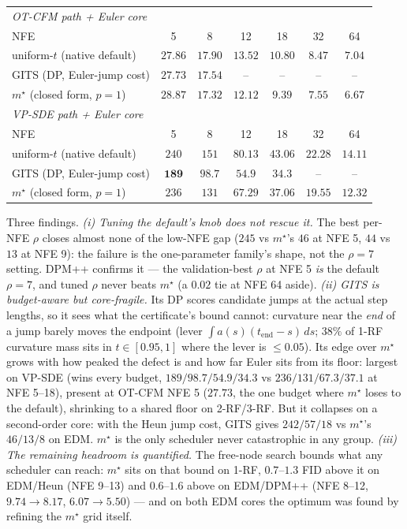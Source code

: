 \documentclass[11pt]{article}
\begin{document}
\begin{table}[p]
\begin{tabular}{lcccccc}
\midrule
\multicolumn{7}{l}{\emph{OT-CFM path + Euler core}}\\[1pt]
\quad NFE & 5 & 8 & 12 & 18 & 32 & 64\\
\quad uniform-$t$ (native default) & $\mathbf{27.86}$ & $17.90$ & $13.52$ & $10.80$ & $8.47$ & $7.04$\\
\quad GITS (DP, Euler-jump cost) & $\mathbf{27.73}$ & $\mathbf{17.54}$ & -- & -- & -- & --\\
\quad $m^\star$ (closed form, $p\!=\!1$) & $28.87$ & $\mathbf{17.32}$ & $\mathbf{12.12}$ & $\mathbf{9.39}$ & $\mathbf{7.55}$ & $\mathbf{6.67}$\\
\midrule
\multicolumn{7}{l}{\emph{VP-SDE path + Euler core}}\\[1pt]
\quad NFE & 5 & 8 & 12 & 18 & 32 & 64\\
\quad uniform-$t$ (native default) & $240$ & $151$ & $80.13$ & $43.06$ & $22.28$ & $14.11$\\
\quad GITS (DP, Euler-jump cost) & $\mathbf{189}$ & $\mathbf{98.7}$ & $\mathbf{54.9}$ & $\mathbf{34.3}$ & -- & --\\
\quad $m^\star$ (closed form, $p\!=\!1$) & $236$ & $131$ & $67.29$ & $37.06$ & $\mathbf{19.55}$ & $\mathbf{12.32}$\\
\bottomrule
\end{tabular}
\end{table}

\noindent Three findings. \emph{(i) Tuning the default's knob does not rescue
it.} The best per-NFE $\rho$ closes almost none of the low-NFE gap ($245$ vs
$m^\star$'s $46$ at NFE 5, $44$ vs $13$ at NFE 9): the failure is the
one-parameter family's shape, not the $\rho\!=\!7$ setting. DPM++ confirms it
--- the validation-best $\rho$ at NFE 5 \emph{is} the default $\rho\!=\!7$, and
tuned $\rho$ never beats $m^\star$ (a $0.02$ tie at NFE 64 aside).
\emph{(ii) GITS is budget-aware but core-fragile.} Its DP scores candidate
jumps at the actual step lengths, so it sees what the certificate's bound
cannot: curvature near the \emph{end} of a jump barely moves the endpoint
(lever $\int a(s)(t_{\mathrm{end}}-s)\,ds$; $38\%$ of 1-RF curvature mass sits
in $t\in[0.95,1]$ where the lever is $\le\!0.05$). Its edge over $m^\star$
grows with how peaked the defect is and how far Euler sits from its floor:
largest on VP-SDE (wins every budget, $189/98.7/54.9/34.3$ vs
$236/131/67.3/37.1$ at NFE 5--18), present at OT-CFM NFE 5 ($27.73$, the one
budget where $m^\star$ loses to the default), shrinking to a shared floor on
2-RF/3-RF. But it collapses on a second-order core: with the Heun jump cost,
GITS gives $242/57/18$ vs $m^\star$'s $46/13/8$ on EDM. $m^\star$ is the only
scheduler never catastrophic in any group.
\emph{(iii) The remaining headroom is quantified.} The free-node search bounds
what any scheduler can reach: $m^\star$ sits on that bound on 1-RF,
$0.7$--$1.3$ FID above it on EDM/Heun (NFE 9--13) and $0.6$--$1.6$ above on
EDM/DPM++ (NFE 8--12, $9.74\!\to\!8.17$, $6.07\!\to\!5.50$) --- and on both EDM
cores the optimum was found by refining the $m^\star$ grid itself.
\end{document}
